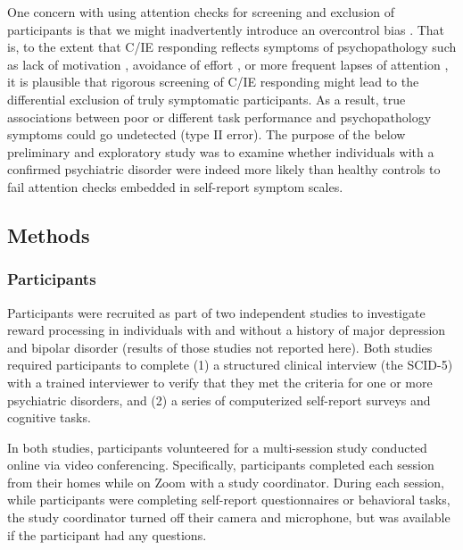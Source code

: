 \documentclass[a4paper,notitlepage,12pt]{article}
\begin{document}
\begin{refsection}[supp]
One concern with using attention checks for screening and exclusion of participants is that we might inadvertently introduce an overcontrol bias \cite{elwert2014endogenous-2}. That is, to the extent that C/IE responding reflects symptoms of psychopathology such as lack of motivation \cite{barch2015mechanisms-2}, avoidance of effort \cite{cohen2001impairments-2, culbreth2016negative-2}, or more frequent lapses of attention \cite{kane2016individual-2, robison2017neurotic-2}, it is plausible that rigorous screening of C/IE responding might lead to the differential exclusion of truly symptomatic participants. As a result, true associations between poor or different task performance and psychopathology symptoms could go undetected (type II error). The purpose of the below preliminary and exploratory study was to examine whether individuals with a confirmed psychiatric disorder were indeed more likely than healthy controls to fail attention checks embedded in self-report symptom scales.  

\subsection*{Methods}

\subsubsection*{Participants}

Participants were recruited as part of two independent studies to investigate reward processing in individuals with and without a history of major depression and bipolar disorder (results of those studies not reported here). Both studies required participants to complete (1) a structured clinical interview (the SCID-5) with a trained interviewer to verify that they met the criteria for one or more psychiatric disorders, and (2) a series of computerized self-report surveys and cognitive tasks. 

In both studies, participants volunteered for a multi-session study conducted online via video conferencing. Specifically, participants completed each session from their homes while on Zoom with a study coordinator. During each session, while participants were completing self-report questionnaires or behavioral tasks, the study coordinator turned off their camera and microphone, but was available if the participant had any questions. 


\end{refsection}
\end{document}
